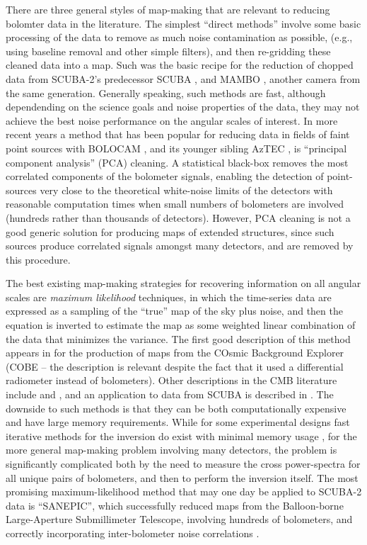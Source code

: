 \documentclass[useAMS,usenatbib,nofootinbib]{mn2e}
\begin{document}
There are three general styles of map-making that are relevant to
reducing bolomter data in the literature. The simplest ``direct
methods'' involve some basic processing of the data to remove as much
noise contamination as possible, (e.g., using baseline removal and
other simple filters), and then re-gridding these cleaned data into a
map. Such was the basic recipe for the reduction of chopped data from
SCUBA-2's predecessor SCUBA
\citep{1998ASPC..145..216J,2000ASPC..216..559J}, and MAMBO
\citep[e.g.][]{omont2001}, another camera from the same
generation. Generally speaking, such methods are fast, although
dependending on the science goals and noise properties of the data,
they may not achieve the best noise performance on the angular scales
of interest. In more recent years a method that has been popular for
reducing data in fields of faint point sources with BOLOCAM
\citep[e.g.][]{laurent2005}, and its younger sibling AzTEC
\citep[e.g.][]{scott2008}, is ``principal component analysis'' (PCA)
cleaning. A statistical black-box removes the most correlated
components of the bolometer signals, enabling the detection of
point-sources very close to the theoretical white-noise limits of the
detectors with reasonable computation times when small numbers of
bolometers are involved (hundreds rather than thousands of
detectors). However, PCA cleaning is not a good generic solution for
producing maps of extended structures, since such sources produce
correlated signals amongst many detectors, and are removed by this
procedure.

The best existing map-making strategies for recovering information on
all angular scales are \emph{maximum likelihood} techniques, in which
the time-series data are expressed as a sampling of the ``true'' map
of the sky plus noise, and then the equation is inverted to estimate
the map as some weighted linear combination of the data that minimizes
the variance.  The first good description of this method appears in
\citet{janssen1992} for the production of maps from the COsmic
Background Explorer (COBE -- the description is relevant despite the
fact that it used a differential radiometer instead of
bolometers). Other descriptions in the CMB literature include
\citet{tegmark1997} and \citet{stompor2002}, and an application to
data from SCUBA is described in \citet{borys2004}.  The downside to
such methods is that they can be both computationally expensive and
have large memory requirements. While for some experimental designs
fast iterative methods for the inversion do exist with minimal memory
usage \citep[e.g.][]{wright1996}, for the more general map-making
problem involving many detectors, the problem is significantly
complicated both by the need to measure the cross power-spectra for
all unique pairs of bolometers, and then to perform the inversion
itself. The most promising maximum-likelihood method that may one day
be applied to SCUBA-2 data is ``SANEPIC'', which successfully reduced
maps from the Balloon-borne Large-Aperture Submillimeter Telescope,
involving hundreds of bolometers, and correctly incorporating
inter-bolometer noise correlations \citep[][]{patanchon2008}.
\end{document}

